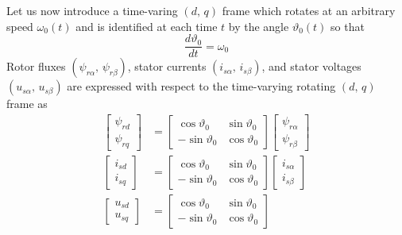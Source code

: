 \documentclass[11pt,a4paper]{scrartcl}
\numberwithin{equation}{section}
\theoremstyle{it}
\theoremstyle{definition}
\begin{document}
\begin{onehalfspace}
Let us now introduce a time-varing $\left(d,\,q\right)$ frame which rotates at 
an arbitrary speed $\omega_0(t)$ and is identified at each time $t$ by the 
angle $\vartheta_0(t)$ so that
\begin{equation}\label{im_eq_39}
	\frac{d\vartheta_0}{dt} = \omega_0
\end{equation}
Rotor fluxes $(\psi_{r\alpha},\,\psi_{r\beta})$, stator currents 
$(i_{s\alpha},\,i_{s\beta})$, and stator voltages $(u_{s\alpha},\,u_{s\beta})$ 
are expressed with respect to the time-varying rotating $(d,\,q)$ frame as 
\begin{equation}\label{im_eq_40}
	\begin{aligned}
		\left[
		\begin{matrix}
			\psi_{rd} \\[6pt]
			\psi_{rq}
		\end{matrix}
		\right] & =
		\left[
		\begin{matrix}
			\cos\vartheta_0 & \sin\vartheta_0 \\[6pt]
			-\sin\vartheta_0 & \cos\vartheta_0 
		\end{matrix}
		\right]
		\left[
		\begin{matrix}
			\psi_{r\alpha} \\[6pt]
			\psi_{r\beta}
		\end{matrix}
		\right] \\[6pt]
		\left[
		\begin{matrix}
			i_{sd} \\[6pt]
			i_{sq}
		\end{matrix}
		\right] & =
		\left[
		\begin{matrix}
			\cos\vartheta_0 & \sin\vartheta_0 \\[6pt]
			-\sin\vartheta_0 & \cos\vartheta_0 
		\end{matrix}
		\right]
		\left[
		\begin{matrix}
			i_{s\alpha} \\[6pt]
			i_{s\beta}
		\end{matrix}
		\right] \\[6pt]
		\left[
		\begin{matrix}
			u_{sd} \\[6pt]
			u_{sq}
		\end{matrix} 
		\right] & = 
		\left[
		\begin{matrix}
			\cos\vartheta_0 & \sin\vartheta_0 \\[6pt]
			-\sin\vartheta_0 & \cos\vartheta_0
		\end{matrix}
		\right]

\end{aligned}
\end{equation}
\end{onehalfspace}
\end{document}
